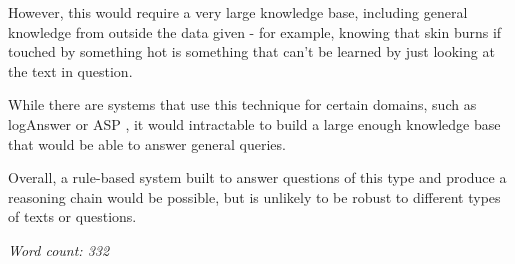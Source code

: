 \documentclass[12pt,a4paper]{article}
\begin{document}
However, this would require a very large knowledge base, including general knowledge from outside the data given - for example, knowing that skin burns if touched by something hot is something that can't be learned by just looking at the text in question.

While there are systems that use this technique for certain domains, such as logAnswer \cite{furbach2008loganswer} or ASP \cite{ASP}, it would intractable to build a large enough knowledge base that would be able to answer general queries.

Overall, a rule-based system built to answer questions of this type and produce a reasoning chain would be possible, but is unlikely to be robust to different types of texts or questions.

\textit{Word count: 332}


\end{document}
